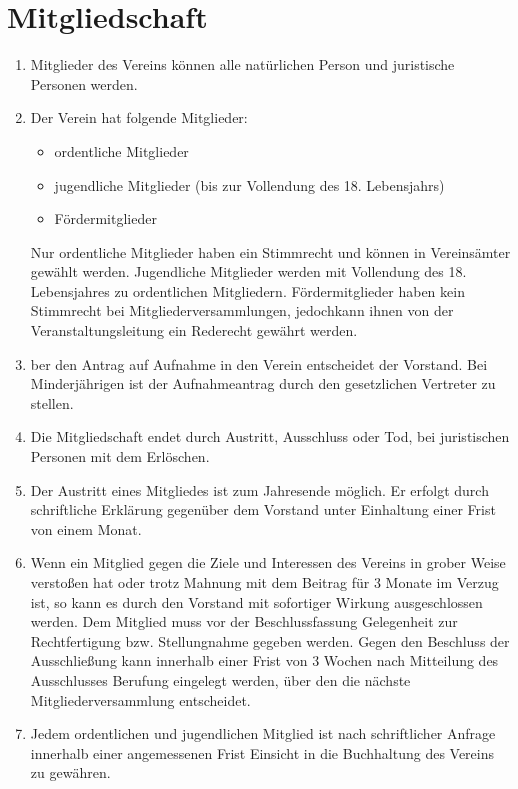 \section{Mitgliedschaft}
\begin{enumerate}
  \item Mitglieder des Vereins können alle natürlichen Person und juristische Personen werden.
  \item Der Verein hat folgende Mitglieder:
    \begin{itemize}
      \item ordentliche Mitglieder
      \item jugendliche Mitglieder (bis zur Vollendung des 18. Lebensjahrs)
      \item Fördermitglieder
    \end{itemize}
    Nur ordentliche Mitglieder haben ein Stimmrecht und können in Vereinsämter gewählt werden. Jugendliche Mitglieder werden mit Vollendung des 18. Lebensjahres zu ordentlichen Mitgliedern. Fördermitglieder haben kein Stimmrecht bei Mitgliederversammlungen, jedochkann ihnen von der Veranstaltungsleitung ein Rederecht gewährt werden.
  \item ber den Antrag auf Aufnahme in den Verein entscheidet der Vorstand. Bei Minderjährigen ist der Aufnahmeantrag durch den gesetzlichen Vertreter zu stellen.
  \item Die Mitgliedschaft endet durch Austritt, Ausschluss oder Tod, bei juristischen Personen mit dem Erlöschen.
  \item Der Austritt eines Mitgliedes ist zum Jahresende möglich. Er erfolgt durch schriftliche Erklärung gegenüber dem Vorstand unter Einhaltung einer Frist von einem Monat.
  \item Wenn ein Mitglied gegen die Ziele und Interessen des Vereins in grober Weise verstoßen hat oder trotz Mahnung mit dem Beitrag für 3 Monate im Verzug ist, so kann es durch den Vorstand mit sofortiger Wirkung ausgeschlossen werden. Dem Mitglied muss vor der Beschlussfassung Gelegenheit zur Rechtfertigung bzw. Stellungnahme gegeben werden. Gegen den Beschluss der Ausschließung kann innerhalb einer Frist von 3 Wochen nach Mitteilung des Ausschlusses Berufung eingelegt werden, über den die nächste Mitgliederversammlung entscheidet.
  \item Jedem ordentlichen und jugendlichen Mitglied ist nach schriftlicher Anfrage innerhalb einer angemessenen Frist Einsicht in die Buchhaltung des Vereins zu gewähren.
\end{enumerate}

